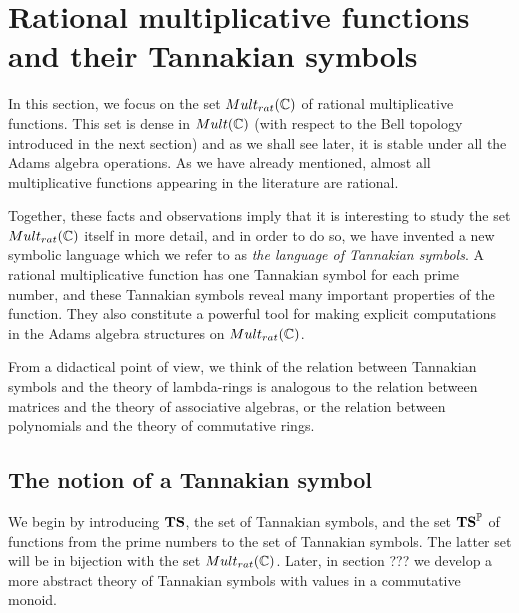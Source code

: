 
\section{Rational multiplicative functions and their Tannakian symbols} \label{sec:TannakianSymbols}

In this section, we focus on the set $Mult_{rat}(\mathbb{C})$ of rational multiplicative functions. This set is dense in $Mult(\mathbb{C})$ (with respect to the Bell topology introduced in the next section) and as we shall see later, it is stable under all the Adams algebra operations. As we have already mentioned, almost all multiplicative functions appearing in the literature are rational. 

Together, these facts and observations imply that it is interesting to study the set $Mult_{rat}(\mathbb{C})$ itself in more detail, and in order to do so, we have invented a new symbolic language which we refer to as \emph{the language of Tannakian symbols}. A rational multiplicative function has one Tannakian symbol for each prime number, and these Tannakian symbols reveal many important properties of the function. They also constitute a powerful tool for making explicit computations in the Adams algebra structures on $Mult_{rat}(\mathbb{C})$. 

From a didactical point of view, we think of the relation between Tannakian symbols and the theory of lambda-rings is analogous to the relation between matrices and the theory of associative algebras, or the relation between polynomials and the theory of commutative rings.




\subsection{The notion of a Tannakian symbol}

We begin by introducing $\mathbf{TS}$, the set of Tannakian symbols, and the set $\mathbf{TS}^{\mathbb{P}}$ of functions from the prime numbers to the set of Tannakian symbols. The latter set will be in bijection with the set $Mult_{rat}(\mathbb{C})$. Later, in section ??? we develop a more abstract theory of Tannakian symbols with values in a commutative monoid. 

